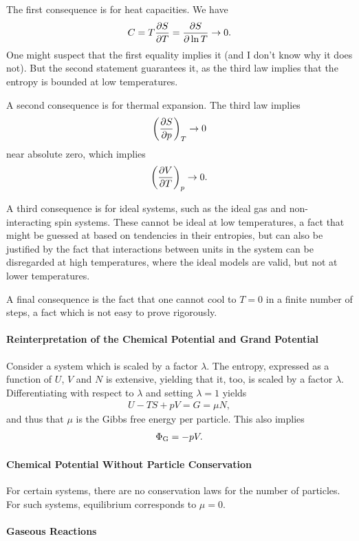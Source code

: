 The first consequence is for heat capacities. We have
\begin{align*}
	C = T\pdv{S}{T} = \pdv{S}{\ln{T}} \to 0.
\end{align*}
One might suspect that the first equality implies it (and I don't know why it does not). But the second statement guarantees it, as the third law implies that the entropy is bounded at low temperatures.

A second consequence is for thermal expansion. The third law implies
\begin{align*}
	\left(\pdv{S}{p}\right)_{T} \to 0
\end{align*}
near absolute zero, which implies
\begin{align*}
	\left(\pdv{V}{T}\right)_{p} \to 0.
\end{align*}

A third consequence is for ideal systems, such as the ideal gas and non-interacting spin systems. These cannot be ideal at low temperatures, a fact that might be guessed at based on tendencies in their entropies, but can also be justified by the fact that interactions between units in the system can be disregarded at high temperatures, where the ideal models are valid, but not at lower temperatures.

A final consequence is the fact that one cannot cool to $T = 0$ in a finite number of steps, a fact which is not easy to prove rigorously.

\paragraph{Reinterpretation of the Chemical Potential and Grand Potential}
Consider a system which is scaled by a factor $\lambda$. The entropy, expressed as a function of $U$, $V$ and $N$ is extensive, yielding that it, too, is scaled by a factor $\lambda$. Differentiating with respect to $\lambda$ and setting $\lambda = 1$ yields
\begin{align*}
	U - TS + pV = G = \mu N,
\end{align*}
and thus that $\mu$ is the Gibbs free energy per particle. This also implies
\begin{align*}
	\Phi_{\text{G}} = -pV.
\end{align*}

\paragraph{Chemical Potential Without Particle Conservation}
For certain systems, there are no conservation laws for the number of particles. For such systems, equilibrium corresponds to $\mu = 0$.

\paragraph{Gaseous Reactions}